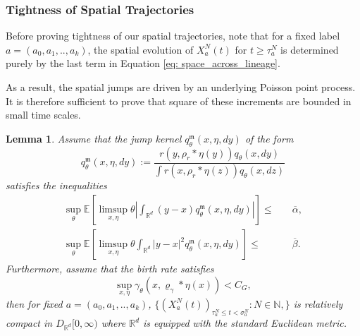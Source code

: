 \documentclass[12pt]{article}
\newtheorem{lemma}[theorem]{Lemma}
\newcommand{\kernel}{\rho}  %
\newcommand{\smooth}[1]{\kernel_{#1} \! * \!}  %
\begin{document}
\subsubsection{Tightness of Spatial Trajectories}
Before proving tightness of our spatial trajectories, 
note that for a fixed label
$a=(a_0,a_1,..,a_k)$,
the spatial evolution of 
$X^N_{a}(t)$ for $t \geq \tau^N_{a}$
is determined
purely by the last term 
in Equation \eqref{eq: space_across_lineage}.

As a result, the spatial jumps are 
driven by 
an underlying Poisson point process. 
It is therefore sufficient
to prove that square of 
these increments are bounded
in small time scales.

\begin{lemma} \label{lem: tightness of individual spatial trajectory}
Assume that the jump kernel $q_\theta^\mathfrak{m}(x, \eta, dy)$ of the form
$$
    q_\theta^\mathfrak{m}(x,\eta,  dy)
    :=
    \frac{
        r(y, \smooth{r} \eta(y)) q_\theta(x, dy)
    }{
        \int r(x, \smooth{r} \eta(z)) q_\theta(x, dz)
    } 
$$
satisfies the inequalities
\begin{align}
   \sup_{\theta}\mathbb{E}\left[\limsup_{x, \eta} \theta \left| \int_{\mathbb{R}^d} (y-x) q^{\mathfrak{m}}_{ \theta}(x,\eta,dy) \right|\right] \leq & \quad \overline{\alpha},\\
   \sup_{\theta}\mathbb{E}\left[\limsup_{x, \eta} \theta \int_{\mathbb{R}^d} |y-x|^2 q^{\mathfrak{m}}_{ \theta}(x,\eta,dy)\right]  \leq & \quad \overline{\beta}.
\end{align}
Furthermore, assume that the birth rate satisfies 
$$\sup_{x, \eta}\gamma_{\theta}(x, \varrho_{\gamma}*\eta(x)) < C_G,$$ 
then for fixed $a=(a_0,a_1,..,a_k)$,
$\{(X^{N}_{a}(t))_{\tau^{N}_a\leq t < \sigma^{N}_{a}}: N \in \mathbb{N},  \}$ is relatively compact in 
$D_{\mathbb{R}^d}[0,\infty )$ where $\mathbb{R}^d$ is equipped with the standard Euclidean metric. 
\end{lemma}
\end{document}
